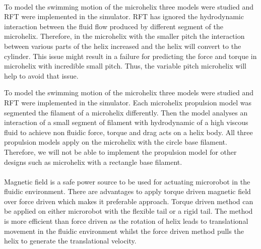 \documentclass[12pt,a4paper,titlepage]{report}
\begin{document}
\paragraph{}

To model the swimming motion of the microhelix three models were studied and \ac*{RFT} were
 implemented in the simulator. \ac*{RFT} has ignored the 
hydrodynamic interaction between the fluid flow produced by different segment of the microhelix. 
Therefore, in the microhelix with the smaller pitch the interaction between various parts of the helix
 increased and the helix will convert to the cylinder. This issue might result in a failure for predicting
 the force and torque in microhelix with incredible small pitch. Thus, the variable pitch microhelix will help to avoid that issue.  

To model the swimming motion of the microhelix three models were studied and \ac*{RFT} were
 implemented in the simulator. 
Each microhelix propulsion model was segmented the filament of a 
microhelix differently. Then the model analyses an interaction of a small segment of
 filament with hydrodynamic of a high viscous fluid to achieve non fluidic force, torque and drag 
acts on a helix body. All three propulsion models apply on the microhelix with the circle base 
filament. Therefore, we will not be able to implement the propulsion model for other designs such 
as microhelix with a rectangle base filament.   




\paragraph{}

Magnetic field is a safe power source to be used for actuating microrobot in the fluidic environment. 
There are advantages to apply torque driven magnetic field over force driven which makes it preferable
 approach. Torque driven method can be applied on either microrobot with the flexible tail or a rigid 
tail. The method is more efficient than force driven as the rotation of helix leads to translational 
movement in the fluidic environment whilst the force driven method pulls the helix to generate
 the translational velocity. 

\paragraph{}
\end{document}
